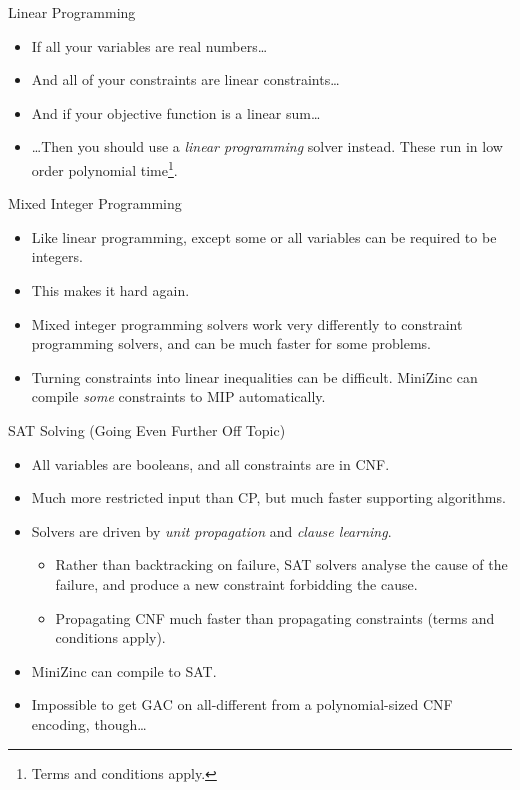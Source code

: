 \documentclass{beamer}
\begin{document}
\begin{frame}{Linear Programming}
    \begin{itemize}
        \item If all your variables are real numbers\ldots
        \item And all of your constraints are linear constraints\ldots
        \item And if your objective function is a linear sum\ldots
        \item \ldots Then you should use a \emph{linear programming} solver instead. These run in
            low order polynomial time\footnote{Terms and conditions apply.}.
    \end{itemize}
\end{frame}

\begin{frame}{Mixed Integer Programming}
    \begin{itemize}
        \item Like linear programming, except some or all variables can be required to be integers.
        \item This makes it hard again.
        \item Mixed integer programming solvers work very differently to constraint programming
            solvers, and can be much faster for some problems.
        \item Turning constraints into linear inequalities can be difficult. MiniZinc can compile
            \emph{some} constraints to MIP automatically.
    \end{itemize}
\end{frame}

\begin{frame}{SAT Solving (Going Even Further Off Topic)}
    \begin{itemize}
        \item All variables are booleans, and all constraints are in CNF.
        \item Much more restricted input than CP, but much faster supporting algorithms.
        \item Solvers are driven by \emph{unit propagation} and \emph{clause learning}.
            \begin{itemize}
                \item Rather than backtracking on failure, SAT solvers analyse the cause of the
                    failure, and produce a new constraint forbidding the cause.
                \item Propagating CNF much faster than propagating constraints
                    (terms and conditions apply).
            \end{itemize}
        \item MiniZinc can compile to SAT.
        \item Impossible to get GAC on all-different from a polynomial-sized
            CNF encoding, though\ldots
    \end{itemize}
\end{frame}
\end{document}
